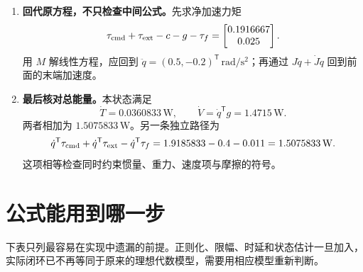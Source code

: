 \begin{enumerate}
\item \textbf{回代原方程，不只检查中间公式。}先求净加速力矩
\[
\tau_{\rm cmd}+\tau_{\rm ext}-c-g-\tau_f
=\begin{bmatrix}0.1916667\\0.025\end{bmatrix}.
\]
用 $M$ 解线性方程，应回到
$\ddot q=(0.5,-0.2)^{\mathsf T}\,\mathrm{rad/s^2}$；再通过 $J\ddot q+\dot J\dot q$ 回到前面的末端加速度。

\item \textbf{最后核对总能量。}本状态满足
\[
\dot T=0.0360833\,\mathrm W,\qquad
\dot V=\dot q^{\mathsf T}g=1.4715\,\mathrm W.
\]
两者相加为 $1.5075833\,\mathrm W$。另一条独立路径为
\[
\dot q^{\mathsf T}\tau_{\rm cmd}
+\dot q^{\mathsf T}\tau_{\rm ext}
-\dot q^{\mathsf T}\tau_f
=1.9185833-0.4-0.011
=1.5075833\,\mathrm W.
\]
这项相等检查同时约束惯量、重力、速度项与摩擦的符号。
\end{enumerate}

\section{公式能用到哪一步}

下表只列最容易在实现中遗漏的前提。正则化、限幅、时延和状态估计一旦加入，实际闭环已不再等同于原来的理想代数模型，需要用相应模型重新判断。

